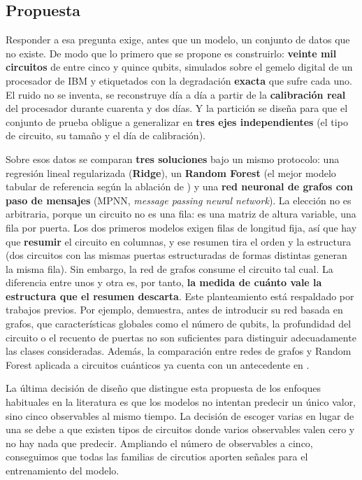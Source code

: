 \subsection{Propuesta}
\label{sec:propuesta}

Responder a esa pregunta exige, antes que un modelo, un conjunto de datos que no existe.
De modo que lo primero que se propone es construirlo: \textbf{veinte mil circuitos} de entre
cinco y quince qubits, simulados sobre el gemelo digital de un procesador de IBM y
etiquetados con la degradación \textbf{exacta} que sufre cada uno. El ruido no se inventa, se
reconstruye día a día a partir de la \textbf{calibración real} del procesador durante cuarenta y
dos días. Y la partición se diseña para que el conjunto de prueba obligue a
generalizar en \textbf{tres ejes independientes} (el tipo de circuito, su tamaño y el día de
calibración).

Sobre esos datos se comparan \textbf{tres soluciones} bajo un mismo protocolo: una regresión
lineal regularizada (\textbf{Ridge}), un \textbf{Random Forest} (el mejor modelo tabular de referencia
según la ablación de ) y una \textbf{red neuronal de grafos con paso de
mensajes} (MPNN, \textit{message passing neural network}). La elección no es arbitraria,
porque un circuito no es una fila: es una matriz de altura variable, una fila por puerta.
Los dos primeros modelos exigen filas de longitud fija, así que hay que \textbf{resumir} el
circuito en columnas, y ese resumen tira el orden y la estructura (dos circuitos
con las mismas puertas estructuradas de formas distintas generan la misma fila). Sin embargo, la red de grafos consume el circuito tal cual. La
diferencia entre unos y otra es, por tanto, \textbf{la medida de cuánto vale la estructura que el
resumen descarta}. Este planteamiento está respaldado por trabajos previos. Por ejemplo,  demuestra, antes de introducir su red basada en grafos, que características globales como el número de qubits, la profundidad del circuito o el recuento de puertas no son suficientes para distinguir adecuadamente las clases consideradas. Además, la comparación entre redes de grafos y Random Forest aplicada a circuitos cuánticos ya cuenta con un antecedente en .

La última decisión de diseño que distingue esta propuesta de los enfoques habituales en la literatura es que los modelos no intentan predecir un único valor, sino cinco observables al mismo tiempo. La decisión de escoger varias en lugar de una se debe a que existen tipos de circuitos donde varios observables valen cero y no hay nada que predecir. Ampliando el número de observables a cinco, conseguimos que todas las familias de circutios aporten señales para el entrenamiento del modelo.


